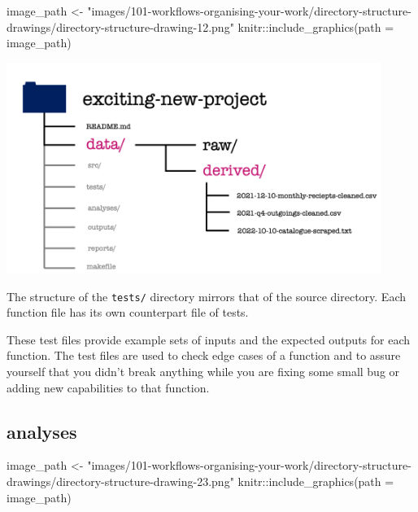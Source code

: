 \documentclass[
  letterpaper,
  DIV=11,
  numbers=noendperiod]{scrreprt}
\newenvironment{Shaded}{\begin{snugshade}}{\end{snugshade}}
\newcommand{\AttributeTok}[1]{\textcolor[rgb]{0.40,0.45,0.13}{#1}}
\newcommand{\FunctionTok}[1]{\textcolor[rgb]{0.28,0.35,0.67}{#1}}
\newcommand{\NormalTok}[1]{\textcolor[rgb]{0.00,0.23,0.31}{#1}}
\newcommand{\OtherTok}[1]{\textcolor[rgb]{0.00,0.23,0.31}{#1}}
\newcommand{\SpecialCharTok}[1]{\textcolor[rgb]{0.37,0.37,0.37}{#1}}
\newcommand{\StringTok}[1]{\textcolor[rgb]{0.13,0.47,0.30}{#1}}
\begin{document}
\begin{Shaded}
\begin{Highlighting}[]
\NormalTok{image\_path }\OtherTok{\textless{}{-}} \StringTok{"images/101{-}workflows{-}organising{-}your{-}work/directory{-}structure{-}drawings/directory{-}structure{-}drawing{-}12.png"}
\NormalTok{knitr}\SpecialCharTok{::}\FunctionTok{include\_graphics}\NormalTok{(}\AttributeTok{path =}\NormalTok{ image\_path)}
\end{Highlighting}
\end{Shaded}

\includegraphics[width=4.8in,height=\textheight]{images/101-workflows-organising-your-work/directory-structure-drawings/directory-structure-drawing-12.png}

The structure of the \texttt{tests/} directory mirrors that of the
source directory. Each function file has its own counterpart file of
tests.

These test files provide example sets of inputs and the expected outputs
for each function. The test files are used to check edge cases of a
function and to assure yourself that you didn't break anything while you
are fixing some small bug or adding new capabilities to that function.

\subsection{analyses}\label{analyses}

\begin{Shaded}
\begin{Highlighting}[]
\NormalTok{image\_path }\OtherTok{\textless{}{-}} \StringTok{"images/101{-}workflows{-}organising{-}your{-}work/directory{-}structure{-}drawings/directory{-}structure{-}drawing{-}23.png"}
\NormalTok{knitr}\SpecialCharTok{::}\FunctionTok{include\_graphics}\NormalTok{(}\AttributeTok{path =}\NormalTok{ image\_path)}
\end{Highlighting}
\end{Shaded}
\end{document}
